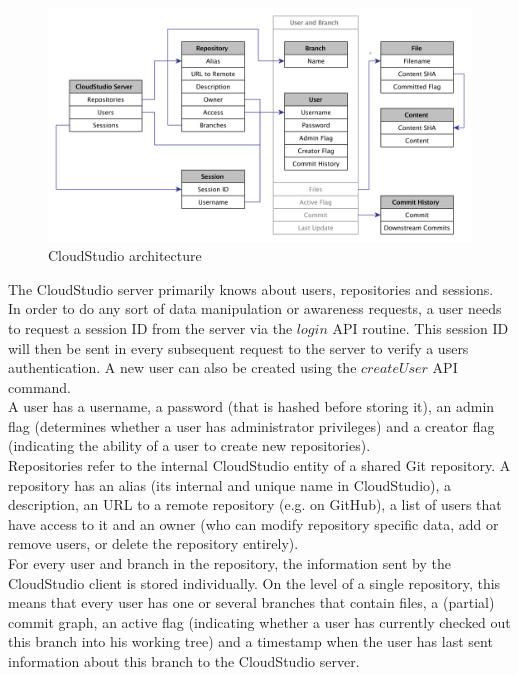 \begin{figure}[h!]
  \centering
      \includegraphics[width=1\textwidth]{entities}
  \caption{CloudStudio architecture}
  \label{fig:entities}
\end{figure}


The CloudStudio server primarily knows about users, repositories and sessions. \\

In order to do any sort of data manipulation or awareness requests, a user needs to request a session ID from the server via the $login$ API routine. This session ID will then be sent in every subsequent request to the server to verify a users authentication. A new user can also be created using the $createUser$ API command. \\

A user has a username, a password (that is hashed before storing it), an admin flag (determines whether a user has administrator privileges) and a creator flag (indicating the ability of a user to create new repositories). \\

Repositories refer to the internal CloudStudio entity of a shared Git repository. A repository has an alias (its internal and unique name in CloudStudio), a description, an URL to a remote repository (e.g. on GitHub), a list of users that have access to it and an owner (who can modify repository specific data, add or remove users, or delete the repository entirely). \\

For every user and branch in the repository, the information sent by the CloudStudio client is stored individually. On the level of a single repository, this means that every user has one or several branches that contain files, a (partial) commit graph, an active flag (indicating whether a user has currently checked out this branch into his working tree) and a timestamp when the user has last sent information about this branch to the CloudStudio server. \\

